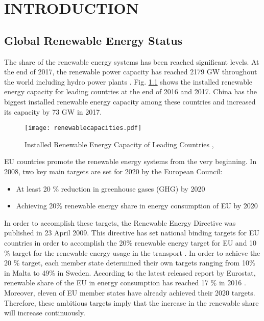 \chapter{INTRODUCTION}
\label{chp:1}
\section{Global Renewable Energy Status}
The share of the renewable energy systems has been reached significant levels. At the end of 2017, the renewable power capacity has reached 2179 GW throughout the world including hydro power plants \cite{InternationalRenewableEnergyAgencyIRENA2018}. Fig. \ref{renewablecap} shows the installed renewable energy capacity for leading countries at the end of 2016 and 2017. China has the biggest installed renewable energy capacity among these countries and increased its capacity by 73 GW in 2017.\par
\begin{figure}[h]
	\centering
	\texttt{[image: renewablecapacities.pdf]}
	\caption[Installed Renewable Energy Capacity of Leading Countries]{Installed Renewable Energy Capacity of Leading Countries \cite{InternationalRenewableEnergyAgencyIRENA2018},\cite{InternationalRenewableEnergyAgency2017}}
	\label{renewablecap}
\end{figure}
EU countries promote the renewable energy systems from the very beginning. In 2008, two key main targets are set for 2020 by the European Council\cite{EuropeanCommission2008}: 
\begin{itemize}  
	\item At least 20 \% reduction in greenhouse gases (GHG) by 2020
	\item Achieving 20\% renewable energy share in energy consumption of EU by 2020
\end{itemize}
In order to accomplish these targets, the Renewable Energy Directive was published in 23 April 2009. This directive has set national binding targets for EU countries in order to accomplish the 20\% renewable energy target for EU and 10 \% target for the renewable energy usage in the transport \cite{EuropeanParliament2009}. In order to achieve the 20 \% target, each member state determined their own targets ranging from 10\% in Malta to 49\% in Sweden. According to the latest released report by Eurostat, renewable share of the EU in energy consumption has reached 17 \% in 2016 \cite{States2016}. Moreover, eleven of EU member states have already achieved their 2020 targets. Therefore, these ambitious targets imply that the increase in the renewable share will increase continuously.\par

